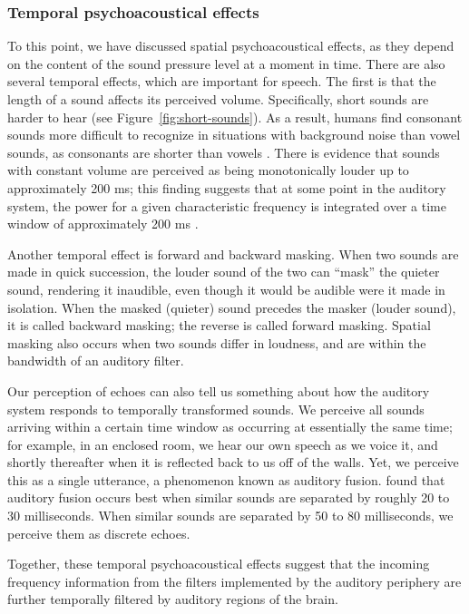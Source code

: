 
\subsubsection{Temporal psychoacoustical effects}

To this point, we have discussed
spatial psychoacoustical effects,
as they depend on the content of
the sound pressure level
at a moment in time.
There are also several temporal effects,
which are important for speech.
The first is that the length
of a sound affects its perceived volume.
Specifically, short sounds are harder to hear
(see Figure~\ref{fig:short-sounds}).
As a result, humans find
consonant sounds more difficult
to recognize in situations with background noise
than vowel sounds,
as consonants are shorter than vowels
\citep[Chapter~3]{everest2001}.
There is evidence that sounds with constant volume
are perceived as being monotonically louder
up to approximately 200 ms;
this finding suggests that
at some point in the auditory system,
the power for a given characteristic frequency
is integrated over a time window
of approximately 200 ms
\citep[p.64]{kollmeier2008}.


Another temporal effect is forward and backward masking.
When two sounds are made in quick succession,
the louder sound of the two can
``mask'' the quieter sound,
rendering it inaudible,
even though it would be audible
were it made in isolation.
When the masked (quieter) sound
precedes the masker (louder sound),
it is called backward masking;
the reverse is called forward masking.
Spatial masking also occurs
when two sounds differ in loudness,
and are within the bandwidth
of an auditory filter.

Our perception of echoes can also tell us
something about how the auditory system
responds to temporally transformed sounds.
We perceive all sounds arriving within
a certain time window as occurring at essentially
the same time;
for example, in an enclosed room,
we hear our own speech as we voice it,
and shortly thereafter when it is reflected
back to us off of the walls.
Yet, we perceive this as a single utterance,
a phenomenon known as auditory fusion.
\citet{haas1972} found that auditory fusion occurs
best when similar sounds are separated by roughly
20 to 30 milliseconds.
When similar sounds are separated by 50 to 80 milliseconds,
we perceive them as discrete echoes.

Together, these temporal psychoacoustical effects
suggest that the incoming frequency information
from the filters implemented by the auditory periphery
are further temporally filtered
by auditory regions of the brain.

